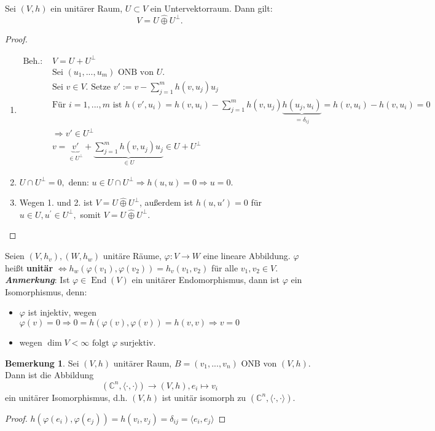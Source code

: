 \documentclass[a4paper, titlepage]{article}
\theoremstyle{definition}
\newtheorem{bem}[satz]{Bemerkung}
\newcommand{\C}{\mathbb{C}}
\begin{document}
\begin{satz}
	Sei $(V,h)$ ein unitärer Raum, $U \subset V $ ein Untervektorraum. Dann gilt:
	$$V = U \hat{\oplus} U^{\bot}.$$
\end{satz}
\begin{proof}
	\begin{enumerate}
		\item \begin{align*}\text{Beh.: } &V = U + U^{\bot}\\
		&\text{Sei } (u_1,...,u_m)  \text{ ONB  von }U. \\
		&\text{Sei }v\in V.\text{ Setze } v' := v - \sum_{j=1}^{m}h(v,u_j)u_j\\
		&\text{Für } i= 1,...,m \text{ ist } h(v',u_i) = h(v,u_i) - \sum_{j=1}^{m}h(v,u_j)\underbrace{h(u_j,u_i)}_{=\delta_{ij}} = h(v,u_i)-h(v,u_i) = 0\\
		&\Rightarrow v' \in U^{\bot}\\
		&v = \underbrace{v'}_{\in U^{\bot}}+\underbrace{\sum_{j=1}^{m}h(v,u_j)u_j}_{\in U} \in U + U^{\bot}
	\end{align*}
		\item $U \cap U^{\bot} = 0,$ denn: $ u \in U \cap U^{\bot} \Rightarrow h(u,u) =0 \Rightarrow u=0.$
		\item Wegen 1. und 2. ist $V = U \hat{\oplus} U^{\bot}$, außerdem ist $h(u,u') = 0$ für $u\in U, u^{'} \in U^{\bot},$ somit $V = U \hat{\oplus} U^{\bot}$.
	\end{enumerate}
\end{proof}
\begin{definition}
	Seien $(V,h_v), (W,h_w)$ unitäre Räume, $\varphi: V \longrightarrow W$ eine lineare Abbildung. $\varphi $ heißt \textbf{unitär} $\Leftrightarrow h_w(\varphi (v_1),\varphi(v_2)) = h_v(v_1,v_2)$ für alle $v_1,v_2 \in V.$\\
	\textit{\textbf{Anmerkung}}: Ist $\varphi \in \operatorname{End}(V)$ ein unitärer Endomorphismus, dann ist $\varphi$ ein Isomorphismus, denn:
	\begin{itemize}
		\item $\varphi$ ist injektiv, wegen $\varphi(v)=0 \Rightarrow 0 = h(\varphi(v),\varphi(v)) = h(v,v) \Rightarrow v= 0$
		\item wegen $\operatorname{dim} V < \infty \text{ folgt } \varphi \text{ surjektiv. }$
	\end{itemize}
\end{definition}
\begin{bem}
	Sei $(V,h)$ unitärer Raum, $B=(v_1,...,v_n)$ ONB von $(V,h).$ Dann ist die Abbildung $$(\C^n,\langle\cdot,\cdot\rangle)\longrightarrow (V,h), e_i \mapsto v_i $$ ein unitärer Isomorphismus, d.h. $(V,h)$ ist unitär isomorph zu $(\C^n,\langle\cdot,\cdot\rangle).$
	\begin{proof}
		$h(\varphi(e_i),\varphi(e_j)) = h(v_i,v_j) = \delta_{ij} = \langle e_i,e_j\rangle$
	\end{proof}
\end{bem}
\end{document}
